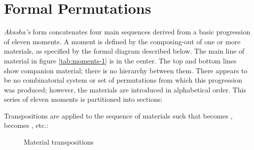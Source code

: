 \section{Formal Permutations}

\textit{Akasha's} form concatenates four main sequences derived from a basic progression of eleven moments. A moment is defined by the composing-out of one or more materials, as specified by the formal diagram described below. The main line of material in figure \ref{tab:moments-1} is in the center. The top and bottom lines show companion material; there is no hierarchy between them. There appears to be no combinatorial system or set of permutations from which this progression was produced; however, the materials are introduced in alphabetical order. This series of eleven moments is partitioned into sections:

\begin{table}[H]
{}
\caption{\textit{Akasha} moments, part 1}
    \label{tab:moments-1}
\end{table}

Transpositions are applied to the sequence of materials such that  becomes ,  becomes , etc.:

\begin{figure}[H]
    \centering
{}
    \caption{Material transpositions}
    \label{fig:akasha-material-transposition-1}
\end{figure}

